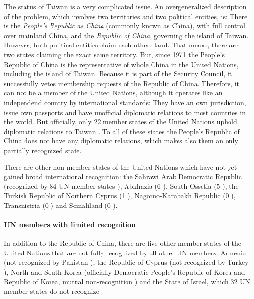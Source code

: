 The status of Taiwan is a very complicated issue. An overgeneralized description of the problem, which involves two territories and two political entities, is: There is the \emph{People's Republic as China} (commonly known as China), with full control over mainland China, and the \emph{Republic of China}, governing the island of Taiwan. However, both political entities claim each others land. That means, there are two states claiming the exact same territory. But, since 1971 the People's Republic of China is the representative of whole China in the United Nations, including the island of Taiwan. Because it is part of the Security Council, it successfully vetos membership requests of the Republic of China. Therefore, it can not be a member of the United Nations, although it operates like an independend country by international standards: They have an own jurisdiction, issue own passports and have unofficial diplomatic relations to most countries in the world. But officially, only 22 member states of the United Nations uphold diplomatic relations to Taiwan \cite{TaiwanRecognition}. To all of these states the People's Republic of China does not have any diplomatic relations, which makes also them an only partially recognized state.

There are other non-member states of the United Nations which have not yet gained broad international recognition: the Sahrawi Arab Democratic Republic (recognized by 84 UN member states \cite{WesternSaharaRecognition}), Abkhazia (6 \cite{AbkhaziaRecognition}), South Ossetia (5 \cite{SouthOssetiaRecognition}), the Turkish Republic of Northern Cyprus (1 \cite{NorthernCyprusRecognition}), Nagorno-Karabakh Republic (0 \cite{NagornoRecognition}), Transnistria (0 \cite{TransnistriaRecognition}) and Somaliland (0 \cite{SomalilandRecognition}).


\paragraph{UN members with limited recognition} %
\label{par:un_members_with_limited_recognition}

In addition to the Republic of China, there are five other member states of the United Nations that are not fully recognized by all other UN members: Armenia (not recognized by Pakistan \cite{ArmeniaRecognition}), the Republic of Cyprus (not recognized by Turkey \cite{CyprusRecognition}), North and South Korea (officially Democratic People's Republic of Korea and Republic of Korea, mutual non-recognition \cite{KoreaRecognition}) and the State of Israel, which 32 UN member states do not recognize \cite{IsraelRecognition}.

